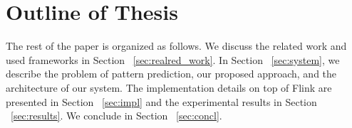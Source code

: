   
\section{Outline of Thesis}

\par The rest of the paper is organized as follows. We discuss the related work and used frameworks in Section ~\ref{sec:realred_work}. In Section ~\ref{sec:system}, we describe the problem of pattern prediction, our proposed approach, and the architecture of our system. The implementation details on top of Flink are presented in Section ~\ref{sec:impl} and the experimental results in Section ~\ref{sec:results}. We conclude in Section ~\ref{sec:concl}.



